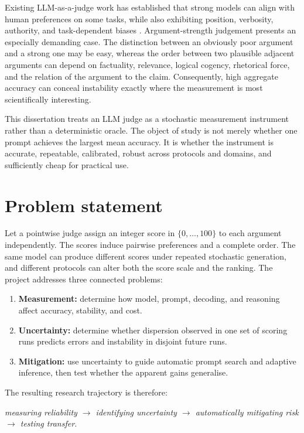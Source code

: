 \documentclass[11pt,twoside,a4paper]{report}
\begin{document}
Existing LLM-as-a-judge work has established that strong models can align with human
preferences on some tasks, while also exhibiting position, verbosity, authority,
and task-dependent biases \cite{zheng2023judging,chen2024judgement,bavaresco2025llmjudges,shi2025positionbias}.
Argument-strength judgement presents an especially demanding case.  The distinction
between an obviously poor argument and a strong one may be easy, whereas the order
between two plausible adjacent arguments can depend on factuality, relevance,
logical cogency, rhetorical force, and the relation of the argument to the claim.
Consequently, high aggregate accuracy can conceal instability exactly where the
measurement is most scientifically interesting.

This dissertation treats an LLM judge as a stochastic measurement instrument rather
than a deterministic oracle.  The object of study is not merely whether one prompt
achieves the largest mean accuracy.  It is whether the instrument is accurate,
repeatable, calibrated, robust across protocols and domains, and sufficiently cheap
for practical use.

\section{Problem statement}

Let a pointwise judge assign an integer score in $\{0,\ldots,100\}$ to each argument
independently.  The scores induce pairwise preferences and a complete order.  The
same model can produce different scores under repeated stochastic generation, and
different protocols can alter both the score scale and the ranking.  The project
addresses three connected problems:

\begin{enumerate}
  \item \textbf{Measurement:} determine how model, prompt, decoding, and reasoning
  affect accuracy, stability, and cost.
  \item \textbf{Uncertainty:} determine whether dispersion observed in one set of
  scoring runs predicts errors and instability in disjoint future runs.
  \item \textbf{Mitigation:} use uncertainty to guide automatic prompt search and
  adaptive inference, then test whether the apparent gains generalise.
\end{enumerate}

The resulting research trajectory is therefore:
\begin{center}
\emph{measuring reliability $\rightarrow$ identifying uncertainty $\rightarrow$
automatically mitigating risk $\rightarrow$ testing transfer.}
\end{center}
\end{document}
